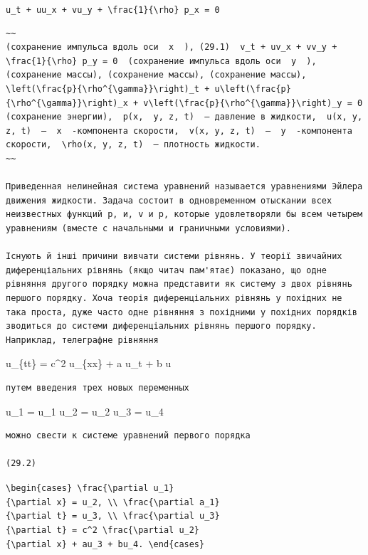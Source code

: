 \documentclass[
  ukrainian,
]{article}
\begin{document}
\texttt{u\_t\ +\ uu\_x\ +\ vu\_y\ +\ \textbackslash{}frac\{1\}\{\textbackslash{}rho\}\ p\_x\ =\ 0}

\begin{verbatim}
~~
(сохранение импульса вдоль оси  x  ), (29.1)  v_t + uv_x + vv_y + \frac{1}{\rho} p_y = 0  (сохранение импульса вдоль оси  y  ), (сохранение массы), (сохранение массы), (сохранение массы),  \left(\frac{p}{\rho^{\gamma}}\right)_t + u\left(\frac{p}{\rho^{\gamma}}\right)_x + v\left(\frac{p}{\rho^{\gamma}}\right)_y = 0  (сохранение энергии),  p(x,  y, z, t)  — давление в жидкости,  u(x, y, z, t)  —  x  -компонента скорости,  v(x, y, z, t)  —  y  -компонента скорости,  \rho(x, y, z, t)  — плотность жидкости.
~~

Приведенная нелинейная система уравнений называется уравнениями Эйлера движения жидкости. Задача состоит в одновременном отыскании всех неизвестных функций р, и, v и р, которые удовлетворяли бы всем четырем уравнениям (вместе с начальными и граничными условиями).

Існують й інші причини вивчати системи рівнянь. У теорії звичайних диференціальних рівнянь (якщо читач пам'ятає) показано, що одне рівняння другого порядку можна представити як систему з двох рівнянь першого порядку. Хоча теорія диференціальних рівнянь у похідних не така проста, дуже часто одне рівняння з похідними у похідних порядків зводиться до системи диференціальних рівнянь першого порядку. Наприклад, телеграфне рівняння
\end{verbatim}

u\_\{tt\} = c\^{}2 u\_\{xx\} + a u\_t + b u

\begin{verbatim}
путем введения трех новых переменных
\end{verbatim}

u\_1 = u\_1 u\_2 = u\_2 u\_3 = u\_4

\begin{verbatim}
можно свести к системе уравнений первого порядка

(29.2)
\end{verbatim}

\texttt{\textbackslash{}begin\{cases\}\ \textbackslash{}frac\{\textbackslash{}partial\ u\_1\}\{\textbackslash{}partial\ x\}\ =\ u\_2,\ \textbackslash{}\textbackslash{}\ \textbackslash{}frac\{\textbackslash{}partial\ a\_1\}\{\textbackslash{}partial\ t\}\ =\ u\_3,\ \textbackslash{}\textbackslash{}\ \textbackslash{}frac\{\textbackslash{}partial\ u\_3\}\{\textbackslash{}partial\ t\}\ =\ c\^{}2\ \textbackslash{}frac\{\textbackslash{}partial\ u\_2\}\{\textbackslash{}partial\ x\}\ +\ au\_3\ +\ bu\_4.\ \textbackslash{}end\{cases\}}
\end{document}
